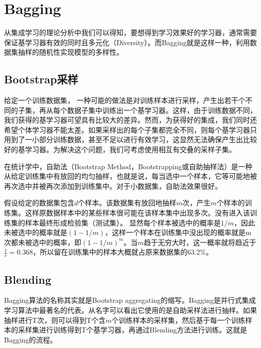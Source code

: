 \documentclass[twoside]{article}
\begin{document}
\section*{Bagging}
从集成学习的理论分析中我们可以得知，要想得到学习效果好的学习器，通常需要保证基学习器有效的同时且多元化（Diversity）。而Bagging就是这样一种，利用数据集抽样的随机性实现模型的多样性。
\subsection*{Bootstrap采样}
给定一个训练数据集， 一种可能的做法是对训练样本进行采样，产生出若干个不同的子集，再从每个数据子集中训练出一个基学习器。这样，由于训练数据不同，我们获得的基学习器可望具有比较大的差异。然而，为获得好的集成，我们同时还希望个体学习器不能太差。如果采样出的每个子集都完全不同，则每个基学习器只用到了一小部分训练数据，甚至不足以进行有效学习，这显然无法确保产生出比较好的基学习器。为解决这个问题，我们可考虑使用相互有交叠的采样子集。

在统计学中，自助法（Bootstrap Method，Bootstrapping或自助抽样法）是一种从给定训练集中有放回的均匀抽样，也就是说，每当选中一个样本，它等可能地被再次选中并被再次添加到训练集中。对于小数据集，自助法效果很好。

    假设给定的数据集包含$d$个样本。该数据集有放回地抽样$m$次，产生$m$个样本的训练集。这样原数据样本中的某些样本很可能在该样本集中出现多次。没有进入该训练集的样本最终形成检验集（测试集）。 显然每个样本被选中的概率是$1/m$，因此未被选中的概率就是$(1-1/m)$，这样一个样本在训练集中没出现的概率就是m次都未被选中的概率，即$(1-1/m)^m$。当$m$趋于无穷大时，这一概率就将趋近于$\frac{1}{e}=0.368$，所以留在训练集中的样本大概就占原来数据集的63.2\%。
\subsection*{Blending}
Bagging算法的名称其实就是\color{red}B\color{black}ootstrap \color{red}agg\color{black}regat\color{red}ing\color{black}的缩写。Bagging是并行式集成学习算法中最著名的代表。从名字可以看出它使用的是自助采样法进行抽样。如果抽样进行T次，则可以得到T个含$m$个训练样本的采样集，然后基于每一个训练样本的采样集进行训练得到T个基学习器，再通过Blending方法进行训练。这就是Bagging的流程。
\end{document}
